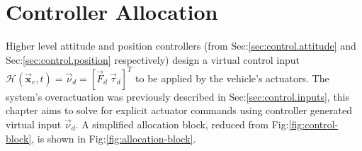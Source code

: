 \chapter{Controller Allocation}
\label{ch:allocation}
Higher level attitude and position controllers (from Sec:\ref{sec:control.attitude} and Sec:\ref{sec:control.position} respectively) design a virtual control input $\mathcal{H}(\vec{\mathbf{x}}_e,t)=\vec{\nu}_d=[\vec{F}_d~\vec{\tau}_d]^T$ to be applied by the vehicle's actuators. The system's overactuation was previously described in Sec:\ref{sec:control.inputs}, this chapter aims to solve for explicit actuator commands using controller generated virtual input $\vec{\nu}_d$. A simplified allocation block, reduced from Fig:\ref{fig:control-block}, is shown in Fig:\ref{fig:allocation-block}.
